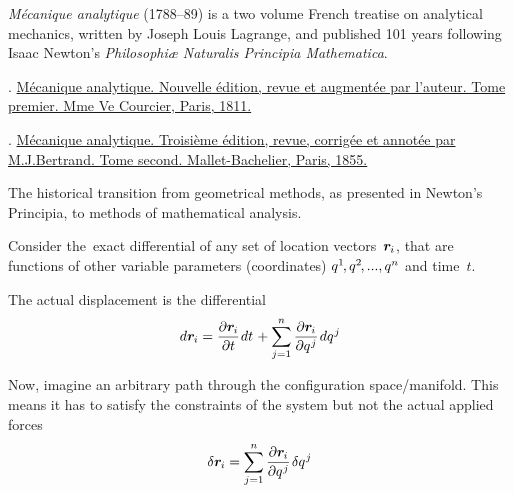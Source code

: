 \emph{Mécanique analytique} (1788--89) is a two volume French treatise on analytical mechanics, written by Joseph Louis Lagrange, and published 101 years following Isaac Newton’s \emph{Philosophiæ Naturalis Principia Mathematica}.

.
\href{https://play.google.com/books/reader?id=Q8MKAAAAYAAJ&pg=GBS.PP7}{Mécanique analytique. Nouvelle édition, revue et augmentée par l’auteur. Tome premier. Mme Ve Courcier, Paris, 1811.} 

.
\href{https://play.google.com/books/reader?id=TmMSAAAAIAAJ&pg=GBS.PP9}{Mécanique analytique. Troisième édition, revue, corrigée et annotée par M.\:J.\:Bertrand. Tome second. Mallet-Bachelier, Paris, 1855.} 

The historical transition from geometrical methods, as presented in Newton’s Principia, to methods of mathematical analysis.

{\small
\setlength{\abovedisplayskip}{2pt}\setlength{\belowdisplayskip}{2pt}

Consider the~exact differential of any set of location vectors~${\bm{r}_{\hspace{-0.1ex}i}}$, that are functions of other variable parameters (coordinates) ${q^{1} \hspace{-0.25ex}, q^{2} \hspace{-0.25ex}, ..., q^{n}}$ and time~$t$.

The actual displacement is the differential
\[
\displaystyle d\bm{r}_{\hspace{-0.1ex}i} = \frac{\partial \bm{r}_{\hspace{-0.1ex}i}}{\partial t} \hspace{.16ex} dt \hspace{.2ex} + \sum_{j=1}^{n} {\frac{\partial \bm{r}_{\hspace{-0.1ex}i}}{\partial q^{\hspace{.1ex}j}}} \hspace{.2ex} dq^{\hspace{.1ex}j}
\]

Now, imagine an arbitrary path through the configuration space/manifold. This means it has to satisfy the constraints of the system but not the actual applied forces
\[
\delta \bm{r}_{\hspace{-0.1ex}i} = \displaystyle\sum_{j=1}^{n} {\displaystyle\frac {\partial \bm{r}_{\hspace{-0.1ex}i}}{\partial q^{\hspace{.1ex}j}}} \hspace{.2ex} \delta q^{\hspace{.1ex}j}
\]

\par}

